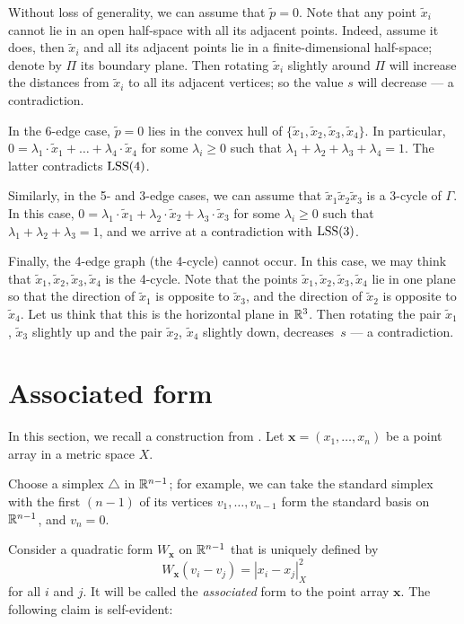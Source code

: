 \documentclass{article}
\begin{document}
Without loss of generality, we can assume that $\tilde p=0$.
Note that any point $\tilde x_i$ cannot lie in an open half-space with all its
adjacent points.
Indeed, assume it does, then $\tilde x_i$ and all its adjacent points lie in a finite-dimensional half-space;
denote by $\Pi$ its boundary plane.
Then rotating $\tilde x_i$  slightly around $\Pi$ will increase the distances from $\tilde x_i$ to all its adjacent vertices;
so the value $s$ will decrease --- a contradiction.

In the 6-edge case, $\tilde p=0$ lies in the convex hull of $\{\tilde x_1,\tilde x_2,\tilde x_3,\tilde x_4\}$.
In particular, $0=\lambda_1\cdot \tilde x_1+\dots+\lambda_4\cdot\tilde x_4$ for some $\lambda_i\ge0$ such that $\lambda_1+\lambda_2+\lambda_3+\lambda_4=1$.
The latter contradicts $\mathrm{LSS}(4)$.

Similarly, in the 5- and 3-edge cases, we can assume that $\tilde x_1\tilde x_2\tilde x_3$ is a 3-cycle of $\Gamma$.
In this case, $0=\lambda_1\cdot \tilde x_1+\lambda_2\cdot\tilde x_2+\lambda_3\cdot\tilde x_3$ for some $\lambda_i\ge0$ such that $\lambda_1+\lambda_2+\lambda_3=1$, and we arrive at a contradiction with $\mathrm{LSS}(3)$.

Finally, the 4-edge graph (the 4-cycle) cannot occur.
In this case, we may think that $\tilde x_1,\tilde x_2,\tilde x_3,\tilde x_4$ is the 4-cycle.
Note that the points $\tilde x_1,\tilde x_2,\tilde x_3,\tilde x_4$  lie in one plane so that the direction of $\tilde x_1$ is opposite to $\tilde x_3$,
and the direction of $\tilde x_2$ is opposite to $\tilde x_4$.
Let us think that this is the horizontal plane in $\mathbb{R}^3$.
Then rotating the pair $\tilde x_1$, $\tilde x_3$ slightly up and 
the pair $\tilde x_2$, $\tilde x_4$  slightly down, decreases~$s$ --- a contradiction.
\qeds

\section{Associated form}

In this section, we recall a construction from \cite{petrunin-2017}.
Let $\bm{x}=(x_1,\dots,x_n)$ be a point array in a metric space $X$.

Choose a simplex $\triangle$ in $\mathbb{R}^{n-1}$; for example, we can take the standard simplex with the first $(n-1)$ of its vertices $v_1,\dots,v_{n-1}$ form the standard basis on $\mathbb{R}^{n-1}$, and $v_n=0$.

Consider a quadratic form $W_{\bm{x}}$ on $\mathbb{R}^{n-1}$ that is uniquely defined by
\[W_{\bm{x}}(v_i-v_j)=|x_i-x_j|^2_X\] 
for all $i$ and $j$.
It will be called
the \emph{associated} form to the point array $\bm{x}$.
The following claim is self-evident:
\end{document}
